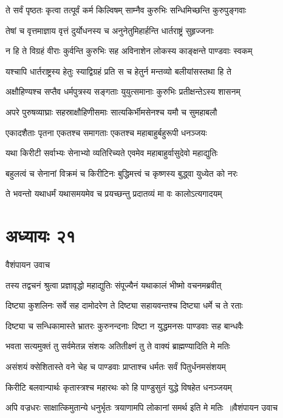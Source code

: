 \twolineshloka
{ते सर्वं पृष्ठतः कृत्वा तत्पूर्वं कर्म किल्विषम्}
{साम्नैव कुरुभिः सन्धिमिच्छन्ति कुरुपुङ्गवाः}


\twolineshloka
{तेषां च वृत्तमाज्ञाय वृत्तं दुर्योधनस्य च}
{अनुनेतुमिहार्हन्ति धार्तराष्ट्रं सुहृज्जनाः}


\twolineshloka
{न हि ते विग्रहं वीराः कुर्वन्ति कुरुभिः सह}
{अविनाशेन लोकस्य काङ्क्षन्ते पाण्डवाः स्वकम्}


\twolineshloka
{यश्चापि धार्तराष्ट्रस्य हेतुः स्याद्विग्रहं प्रति}
{स च हेतुर्न मन्तव्यो बलीयांसस्तथा हि ते}


\twolineshloka
{अक्षौहिण्यश्च सप्तैव धर्मपुत्रस्य सङ्गताः}
{युयुत्समानाः कुरुभिः प्रतीक्षन्तेऽस्य शासनम्}


\twolineshloka
{अपरे पुरुषव्याघ्राः सहस्राक्षौहिणीसमाः}
{सात्यकिर्भीमसेनश्च यमौ च सुमहाबलौ}


\twolineshloka
{एकादशैताः पृतना एकतश्च समागताः}
{एकतश्च महाबाहुर्बहुरूपी धनञ्जयः}


\twolineshloka
{यथा किरीटी सर्वाभ्यः सेनाभ्यो व्यतिरिच्यते}
{एवमेव महाबाहुर्वासुदेवो महाद्युतिः}


\twolineshloka
{बहुलत्वं च सेनानां विक्रमं च किरीटिनः}
{बुद्धिमत्त्वं च कृष्णस्य बुद्ध्वा युध्येत को नरः}


\twolineshloka
{ते भवन्तो यथाधर्मं यथासमयमेव च}
{प्रयच्छन्तु प्रदातव्यं मा वः कालोऽत्यगादयम्}


\chapter{अध्यायः २१}
\twolineshloka
{वैशंपायन उवाच}
{}


\twolineshloka
{तस्य तद्वचनं श्रुत्वा प्रज्ञावृद्धो महाद्युतिः}
{संपूज्यैनं यथाकालं भीष्मो वचनमब्रवीत्}


\twolineshloka
{दिष्ट्या कुशलिनः सर्वे सह दामोदरेण ते}
{दिष्ट्या सहायवन्तश्च दिष्ट्या धर्मे च ते रताः}


\twolineshloka
{दिष्ट्या च सन्धिकामास्ते भ्रातरः कुरुनन्दनाः}
{दिष्टा न युद्धमनसः पाण्डवाः सह बान्धवैः}


\twolineshloka
{भवता सत्यमुक्तं तु सर्वमेतन्न संशयः}
{अतितीक्ष्णं तु ते वाक्यं ब्राह्मण्यादिति मे मतिः}


\twolineshloka
{असंशयं क्सेशितास्ते वने चेह च पाण्डवाः}
{प्राप्ताश्च धर्मतः सर्वं पितुर्धनमसंशयम्}


\twolineshloka
{किरीटि बलवान्पार्थः कृतास्त्रश्च महारथः}
{को हि पाण्डुसुतं युद्धे विषहेत धनञ्जयम्}


\threelineshloka
{अपि वज्रधरः साक्षात्किमुतान्ये धनुर्भृतः}
{त्रयाणामपि लोकानां समर्थ इति मे मतिः ॥वैशंपायन उवाच}
{}


